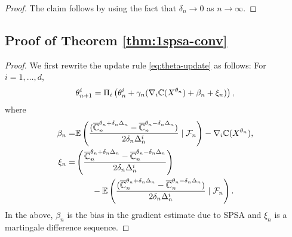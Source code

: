 \begin{proof}
The claim follows by using the fact that $\delta_n \rightarrow 0$ as $n\rightarrow \infty$.
\end{proof}

\subsection*{Proof of Theorem \ref{thm:1spsa-conv}}

\begin{proof}

We first rewrite the update rule \eqref{eq:theta-update} as follows: For $i=1,\ldots,d$,
\begin{align}
\theta^{i}_{n+1}  =  \Pi_i\left(\theta^{i}_n +  \gamma_n(\nabla_{i} \mathbb{C}(X^{\theta_n}) + \beta_n + \xi_n)\right), 
\label{eq:1spsa-equiv}
\end{align}
where 
\begin{align*}
\beta_n = &\mathbb{E}\left(\dfrac{(\overline {\mathbb{C}}_n^{\theta_n + \delta_n \Delta_n} -\overline {\mathbb{C}}_n^{\theta_n - \delta_n \Delta_n})}{2 \delta_n \Delta_n^{i}} \mid \mathcal{F}_n \right) - \nabla_i \mathbb{C}(X^{\theta_n}),\\
\xi_n = & \left(\dfrac{\overline {\mathbb{C}}_n^{\theta_n + \delta_n \Delta_n} -\overline {\mathbb{C}}_n^{\theta_n - \delta_n \Delta_n}}{2 \delta_n\Delta_n^{i}}\right) \\
&\qquad - \mathbb{E}\left(\dfrac{(\overline {\mathbb{C}}_n^{\theta_n + \delta_n \Delta_n} -\overline {\mathbb{C}}_n^{\theta_n - \delta_n \Delta_n})}{2 \delta_n \Delta_n^{i}}\mid \mathcal{F}_n \right).
\end{align*}
In the above, $\beta_n$ is the bias in the gradient estimate due to SPSA and $\xi_n$ is a martingale difference sequence.


\end{proof}
